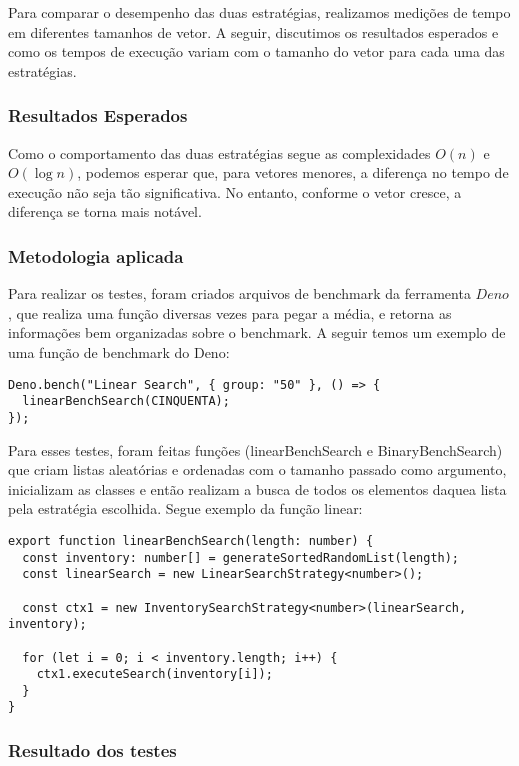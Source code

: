 Para comparar o desempenho das duas estratégias, realizamos medições de tempo em diferentes tamanhos de vetor. 
A seguir, discutimos os resultados esperados e como os tempos de execução variam com o tamanho do vetor para cada uma das estratégias.

\subsubsection{Resultados Esperados}

Como o comportamento das duas estratégias segue as complexidades \( O(n) \) e \( O(\log n) \), 
podemos esperar que, para vetores menores, a diferença no tempo de execução não seja tão significativa. 
No entanto, conforme o vetor cresce, a diferença se torna mais notável.

\subsubsection{Metodologia aplicada}

Para realizar os testes, foram criados arquivos de benchmark da ferramenta $Deno$, 
que realiza uma função diversas vezes para pegar a média, e retorna as informações bem
organizadas sobre o benchmark. A seguir temos um exemplo de uma função de benchmark do Deno:


\begin{verbatim}
Deno.bench("Linear Search", { group: "50" }, () => {
  linearBenchSearch(CINQUENTA);
});
\end{verbatim}

Para esses testes, foram feitas funções (linearBenchSearch e BinaryBenchSearch) 
que criam listas aleatórias e ordenadas com o tamanho passado como argumento,
inicializam as classes e então realizam a busca de todos os elementos daquea lista
pela estratégia escolhida. Segue exemplo da função linear:


\begin{verbatim}
export function linearBenchSearch(length: number) {
  const inventory: number[] = generateSortedRandomList(length);
  const linearSearch = new LinearSearchStrategy<number>();

  const ctx1 = new InventorySearchStrategy<number>(linearSearch, inventory);

  for (let i = 0; i < inventory.length; i++) {
    ctx1.executeSearch(inventory[i]);
  }
}
\end{verbatim}

\subsubsection{Resultado dos testes}

